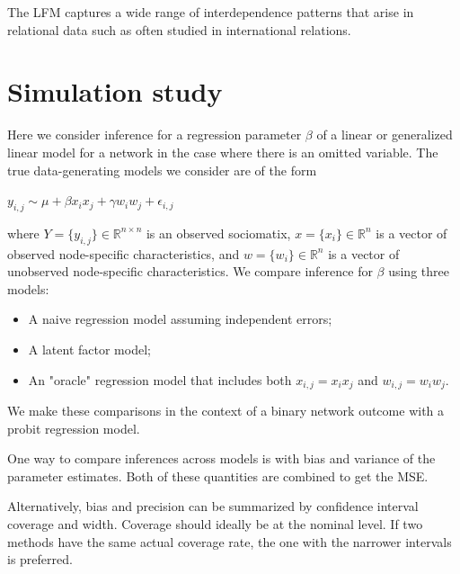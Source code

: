 \documentclass[12pt]{amsart}
\begin{document}
The LFM captures a wide range of interdependence patterns that arise in relational data such as often studied in international relations. 

\section{Simulation study}

Here we consider inference for a regression parameter $\beta$ of a linear or generalized linear model for a network in the case where there is an omitted variable. The true data-generating models we consider are of the form 

$y_{i,j} \sim  \mu + \beta x_i x_j + \gamma w_i w_j + \epsilon_{i,j} $

where $Y= \{y_{i,j}\}\in \mathbb R^{n\times n}$ is an observed sociomatix, $x = \{x_i \} \in \mathbb R^n$ is a vector of observed node-specific characteristics, and $w = \{ w_i\} \in \mathbb R^n$ is a vector of unobserved node-specific characteristics. We compare inference for $\beta$ using three models:

\begin{itemize}
	\item A naive regression model assuming independent errors; 
	\item A latent factor model; 
	\item An "oracle" regression model that includes both $x_{i,j}=x_i x_j$ and $w_{i,j}=w_i w_j$. 
\end{itemize}

We make these comparisons in the context of a binary network outcome with a probit regression model. 

One way to compare inferences across models is  with bias and variance of the parameter estimates. Both of these quantities are combined to get the MSE. 

Alternatively, bias and precision can be summarized by confidence interval coverage and width. Coverage should ideally be at the nominal level. If two methods have the same actual coverage rate, the one with the narrower intervals is preferred. 
\end{document}
